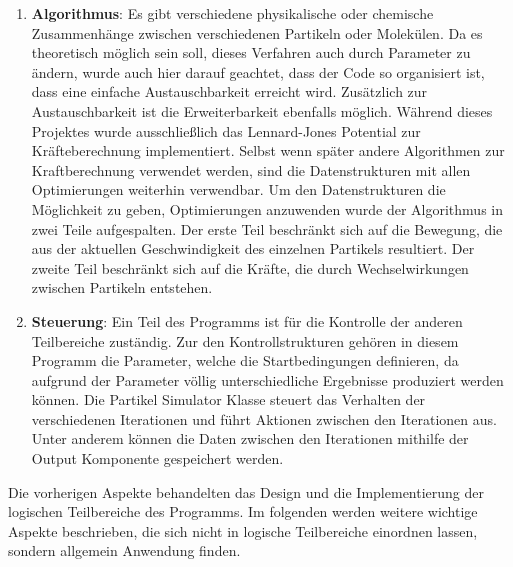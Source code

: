 \documentclass[
12pt,
a4paper,
BCOR10mm,
DIV14,
headsepline,
]{scrreprt}
\begin{document}
\begin{enumerate}
		\item \textbf{Algorithmus}: Es gibt verschiedene physikalische oder chemische Zusammenhänge zwischen verschiedenen Partikeln oder Molekülen. Da es theoretisch möglich sein soll, dieses Verfahren auch durch Parameter zu ändern, wurde auch hier darauf geachtet, dass der Code so organisiert ist, dass eine einfache Austauschbarkeit erreicht wird. Zusätzlich zur Austauschbarkeit ist die Erweiterbarkeit ebenfalls möglich. Während dieses Projektes wurde ausschließlich das Lennard-Jones Potential zur Kräfteberechnung implementiert. Selbst wenn später andere Algorithmen zur Kraftberechnung verwendet werden, sind die Datenstrukturen mit allen Optimierungen weiterhin verwendbar. Um den Datenstrukturen die Möglichkeit zu geben, Optimierungen anzuwenden wurde der Algorithmus in zwei Teile aufgespalten. Der erste Teil beschränkt sich auf die Bewegung, die aus der aktuellen Geschwindigkeit des einzelnen Partikels resultiert. Der zweite Teil beschränkt sich auf die Kräfte, die durch Wechselwirkungen zwischen Partikeln entstehen.
		\item \textbf{Steuerung}: Ein Teil des Programms ist für die Kontrolle der anderen Teilbereiche zuständig. Zur den Kontrollstrukturen gehören in diesem Programm die Parameter, welche die Startbedingungen definieren, da aufgrund der Parameter völlig unterschiedliche Ergebnisse produziert werden können. Die Partikel Simulator Klasse steuert das Verhalten der verschiedenen Iterationen und führt Aktionen zwischen den Iterationen aus. Unter anderem können die Daten zwischen den Iterationen mithilfe der Output Komponente gespeichert werden.
	\end{enumerate}
	Die vorherigen Aspekte behandelten das Design und die Implementierung der logischen Teilbereiche des Programms. Im folgenden werden weitere wichtige Aspekte beschrieben, die sich nicht in logische Teilbereiche einordnen lassen, sondern allgemein Anwendung finden.
\end{document}
